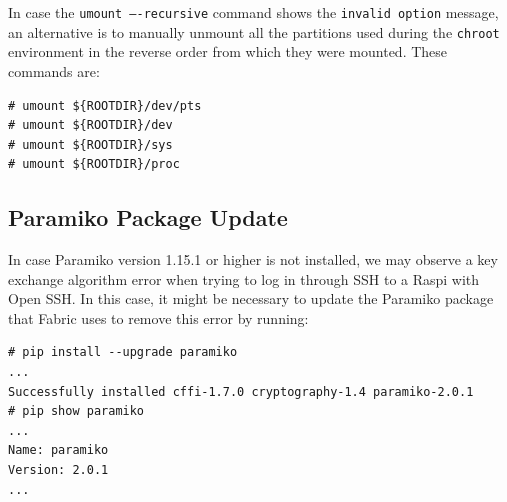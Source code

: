 \documentclass[electronics,article,accept,moreauthors,pdftex,10pt,a4paper]{mdpi}
\theoremstyle{mdpi}
\newcounter{thm}
\newcounter{ex}
\newcounter{re}
\theoremstyle{mdpidefinition}
\begin{document}


In case the \texttt{umount ----recursive} command shows the \texttt{invalid option}
message, an alternative is to manually unmount all the partitions used
during the \texttt{chroot} environment in the reverse order from which they were mounted.
These commands are:

\begin{lstlisting}[]
# umount ${ROOTDIR}/dev/pts
# umount ${ROOTDIR}/dev
# umount ${ROOTDIR}/sys
# umount ${ROOTDIR}/proc
\end{lstlisting}
\FloatBarrier
\vspace{-5mm}

\subsection{Paramiko Package Update}
\label{sec:paramiko}
In case Paramiko version 1.15.1 or higher is not installed, we may observe
a key exchange algorithm error when trying to log in through SSH to a
Raspi with Open SSH. In this case, it might be necessary to update the Paramiko
package that Fabric uses to remove this error by running:

\begin{lstlisting}[]
# pip install --upgrade paramiko
...
Successfully installed cffi-1.7.0 cryptography-1.4 paramiko-2.0.1
# pip show paramiko
...
Name: paramiko
Version: 2.0.1
...
\end{lstlisting}
\FloatBarrier
\vspace{-5mm}

\end{document}
